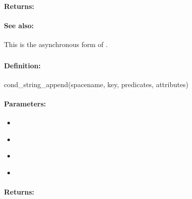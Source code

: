 \paragraph{Returns:}


\paragraph{See also:}  This is the asynchronous form of .

\pagebreak
\subsubsection{}
\label{api:ruby:cond_string_append}


\paragraph{Definition:}
\begin{rubycode}
cond_string_append(spacename, key, predicates, attributes)
\end{rubycode}

\paragraph{Parameters:}
\begin{itemize}[noitemsep]
\item {}\\

\item {}\\

\item {}\\

\item {}\\

\end{itemize}

\paragraph{Returns:}


